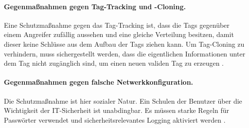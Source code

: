 \paragraph{Gegenmaßnahmen gegen Tag-Tracking und -Cloning.}
Eine Schutzmaßnahme gegen das Tag-Tracking ist, dass die Tags gegenüber einem
Angreifer zufällig aussehen und eine gleiche Verteilung besitzen, damit dieser
keine Schlüsse aus dem Aufbau der Tags ziehen kann. Um Tag-Cloning zu
verhindern, muss sichergestellt werden, dass die eigentlichen Informationen
unter dem Tag nicht zugänglich sind, um einen neuen validen Tag zu erzeugen
\cite{paper}.

\paragraph{Gegenmaßnahmen gegen falsche Netwerkkonfiguration.}
Die Schutzmaßnahme ist hier sozialer Natur. Ein Schulen der Benutzer über die
Wichtigkeit der IT-Sicherheit ist unabdingbar. Es müssen starke Regeln für
Passwörter verwendet und sicherheitsrelevantes Logging aktiviert werden
\cite{paper}.
